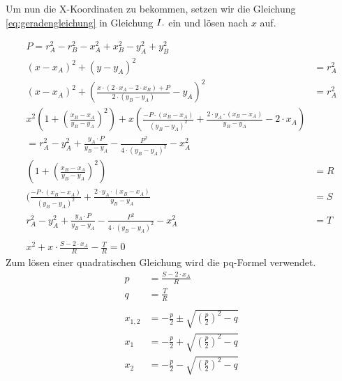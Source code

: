 Um nun die X-Koordinaten zu bekommen, setzen wir die Gleichung \ref{eq:geradengleichung} in Gleichung $\RM{1}$ ein und lösen nach $x$ auf.

\begin{equation}\label{eq:x_aufloesen}
\begin{split}
P = r_{A}^{2} - r_{B}^{2} - x_{A}^{2} + x_{B}^{2} - y_{A}^{2} + y_{B}^{2}
\\
(x-x_{A})^{2}+(y-y_{A})^{2}&=r_{A}^{2}\\
(x-x_{A})^{2} + (\frac{ x \cdot (2 \cdot x_{A} - 2 \cdot x_{B}) + P}{2 \cdot (y_{B} - y_{A})} - y_{A})^{2}&=r_{A}^{2}
\\
x^{2}(1+(\frac{x_{B}-x_{A}}{y_{B}-y_{A}})^{2}) + x (\frac{-P \cdot (x_{B} - x_{A})}{(y_{B} - y_{A})^{2}} + \frac{2 \cdot y_{A} \cdot (x_{B}-x_{A})}{y_{B} - y_{A}} - 2 \cdot x_{A}) \\
= r_{A}^{2} - y_{A}^{2} + \frac{y_{A} \cdot P}{y_{B}-y_{A}} - \frac{P^{2}}{4 \cdot (y_{B}-y_{A})^{2}} - x_{A}^{2}
\\
(1+(\frac{x_{B}-x_{A}}{y_{B}-y_{A}})^{2}) &= R
\\
(\frac{-P \cdot (x_{B} - x_{A})}{(y_{B} - y_{A})^{2}} + \frac{2 \cdot y_{A} \cdot (x_{B}-x_{A})}{y_{B} - y_{A}} &= S
\\
r_{A}^{2} - y_{A}^{2} + \frac{y_{A} \cdot P}{y_{B}-y_{A}} - \frac{P^{2}}{4 \cdot (y_{B}-y_{A})^{2}} - x_{A}^{2} &= T
\\
\\
x^{2} + x \cdot \frac{S - 2 \cdot x_{A}}{R} - \frac{T}{R} = 0
\end{split}
\end{equation}
Zum lösen einer quadratischen Gleichung wird die pq-Formel verwendet.
\begin{equation}\label{eq:x_aufloesen_pq_formel}
\begin{split}
p &= \frac{S - 2 \cdot x_{A}}{R}
\\
q &= \frac{T}{R}
\\
\\
x_{1,2} &= -\frac{p}{2} \pm \sqrt{(\frac{p}{2})^{2} -q}
\\
x_{1} &= -\frac{p}{2} + \sqrt{(\frac{p}{2})^{2} -q}
\\
x_{2} &= -\frac{p}{2} - \sqrt{(\frac{p}{2})^{2} -q}
\end{split}
\end{equation}

